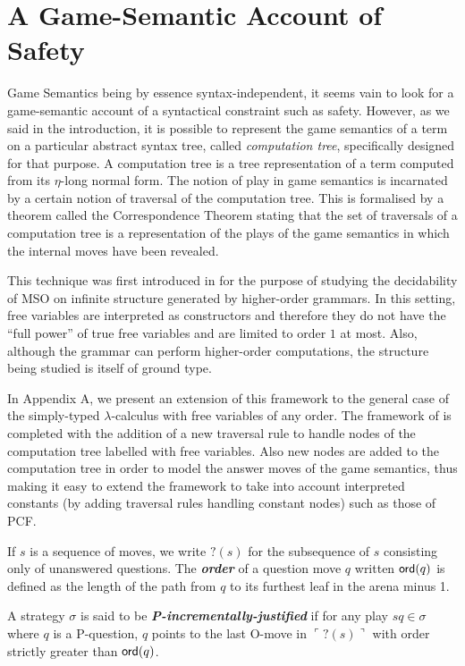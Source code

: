 \documentclass{llncs}
\newcommand\defname[1]{{\bf\em #1}\index{#1}}
\newcommand\ord[1]{{\sf ord}(#1)}
\newcommand\pcf{\textsf{PCF}}
\newcommand{\pview}[1]{\ulcorner #1 \urcorner}
\begin{document}
\section{A Game-Semantic Account of Safety}
\label{sec:gamesemaccount}
Game Semantics being by essence syntax-independent, it seems vain to look for a game-semantic account of a syntactical constraint such as safety. However, as we said in the introduction, it is possible to represent the game semantics of a term on a particular  abstract syntax tree, called \emph{computation tree}, specifically designed for that purpose. A computation tree is a tree representation of a term  computed from its $\eta$-long normal form. The notion of play in game semantics is incarnated by a certain notion of traversal of the computation tree. This is formalised by a theorem called the Correspondence Theorem stating that the set of traversals of a computation tree is a representation of the plays of the game semantics in which  the internal moves have been revealed.

This technique was first introduced in \cite{OngLics2006} for the purpose of studying the decidability of MSO on infinite structure generated by higher-order grammars. In this setting, free variables are interpreted as constructors and therefore they do not have the ``full power'' of true free variables and are limited to order $1$ at most. Also, although the grammar can perform higher-order computations, the structure being studied is itself of ground type.

In Appendix A, we present an extension of this framework to the general case of the simply-typed $\lambda$-calculus with free variables of any order. The framework of  \cite{OngLics2006} is completed with the addition of a new traversal rule to handle nodes of the computation tree labelled with free variables. Also new nodes are added to the computation tree in order to model the answer moves of the game semantics, thus making it easy to extend  the framework to take into account interpreted constants (by adding traversal rules handling constant nodes) such as those of \pcf.


If $s$ is a sequence of moves, we write $?(s)$ for the subsequence of $s$ consisting only of unanswered questions. The \defname{order} of
a question move $q$ written $\ord{q}$ is defined as the length of the path from $q$ to its furthest leaf in the arena minus 1.

\begin{definition}
A strategy $\sigma$ is said to be \defname{P-incrementally-justified}
if for any play $s q \in \sigma$ where $q$ is a P-question,
$q$ points to the last O-move in $\pview{?(s)}$ with order strictly greater than $\ord{q}$.
\end{definition}
\end{document}
